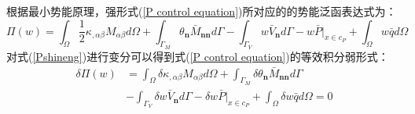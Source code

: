 根据最小势能原理，强形式(\ref{P control equation})所对应的的势能泛函表达式为：
\begin{equation}\label{Pshineng}
    \Pi(w)=\int_{\Omega}\frac{1}{2}\kappa_{,\alpha\beta}M_{\alpha\beta}d\Omega+\int_{\Gamma_M}\theta_{\pmb{n}}\bar{M}_{\pmb{nn}}d\Gamma
    -\int_{\Gamma_V}w\bar{V}_{\pmb{n}}d\Gamma-w\bar{P}\vert_{x\in c_P}+\int_{\Omega}w\bar{q}d\Omega
\end{equation}
对式(\ref{Pshineng})进行变分可以得到式(\ref{P control equation})的等效积分弱形式：
\begin{equation}\label{Pweakform}
\begin{split}
        \delta\Pi(w)&=\int_{\Omega}\delta\kappa_{,\alpha\beta}M_{\alpha\beta}d\Omega+\int_{\Gamma_M}\delta\theta_{\pmb{n}}\bar{M}_{\pmb{nn}}d\Gamma\\
        &-\int_{\Gamma_V}\delta w\bar{V}_{\pmb{n}}d\Gamma-\delta w\bar{P}\vert_{x\in c_P}+\int_{\Omega}\delta w\bar{q}d\Omega=0
\end{split}
\end{equation}\par
